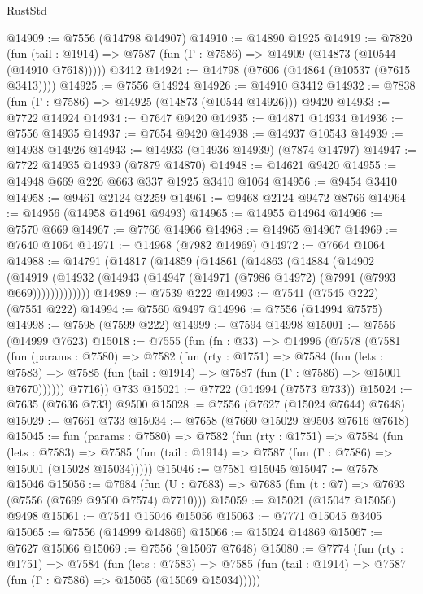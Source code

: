 \begin{lexlean}{RustStd}
\begin{coremodule}
@14909 := @7556 (@14798 @14907)
@14910 := @14890 @1925
@14919 := @7820
    (fun (tail : @1914) => @7587 (fun (Γ : @7586) => @14909 (@14873 (@10544 (@14910 @7618)))))
    @3412
@14924 := @14798 (@7606 (@14864 (@10537 (@7615 @3413))))
@14925 := @7556 @14924
@14926 := @14910 @3412
@14932 := @7838 (fun (Γ : @7586) => @14925 (@14873 (@10544 @14926))) @9420
@14933 := @7722 @14924
@14934 := @7647 @9420
@14935 := @14871 @14934
@14936 := @7556 @14935
@14937 := @7654 @9420
@14938 := @14937 @10543
@14939 := @14938 @14926
@14943 := @14933 (@14936 @14939) (@7874 @14797)
@14947 := @7722 @14935 @14939 (@7879 @14870)
@14948 := @14621 @9420
@14955 := @14948 @669 @226 @663 @337 @1925 @3410 @1064
@14956 := @9454 @3410
@14958 := @9461 @2124 @2259
@14961 := @9468 @2124 @9472 @8766
@14964 := @14956 (@14958 @14961 @9493)
@14965 := @14955 @14964
@14966 := @7570 @669
@14967 := @7766 @14966
@14968 := @14965 @14967
@14969 := @7640 @1064
@14971 := @14968 (@7982 @14969)
@14972 := @7664 @1064
@14988 := @14791
    (@14817
      (@14859
        (@14861
          (@14863
            (@14884
              (@14902
                (@14919
                  (@14932 (@14943 (@14947 (@14971 (@7986 @14972) (@7991 (@7993 @669)))))))))))))
@14989 := @7539 @222
@14993 := @7541 (@7545 @222) (@7551 @222)
@14994 := @7560 @9497
@14996 := @7556 (@14994 @7575)
@14998 := @7598 (@7599 @222)
@14999 := @7594 @14998
@15001 := @7556 (@14999 @7623)
@15018 := @7555
    (fun (fn : @33) =>
    @14996
      (@7578
        (@7581
          (fun (params : @7580) =>
          @7582
            (fun (rty : @1751) =>
            @7584
              (fun (lets : @7583) =>
              @7585 (fun (tail : @1914) => @7587 (fun (Γ : @7586) => @15001 @7670))))))
        @7716))
    @733
@15021 := @7722 (@14994 (@7573 @733))
@15024 := @7635 (@7636 @733) @9500
@15028 := @7556 (@7627 (@15024 @7644) @7648)
@15029 := @7661 @733
@15034 := @7658 (@7660 @15029 @9503 @7616 @7618)
@15045 := fun (params : @7580) =>
  @7582
    (fun (rty : @1751) =>
    @7584
      (fun (lets : @7583) =>
      @7585 (fun (tail : @1914) => @7587 (fun (Γ : @7586) => @15001 (@15028 @15034)))))
@15046 := @7581 @15045
@15047 := @7578 @15046
@15056 := @7684 (fun (U : @7683) => @7685 (fun (t : @7) => @7693 (@7556 (@7699 @9500 @7574) @7710)))
@15059 := @15021 (@15047 @15056) @9498
@15061 := @7541 @15046 @15056
@15063 := @7771 @15045 @3405
@15065 := @7556 (@14999 @14866)
@15066 := @15024 @14869
@15067 := @7627 @15066
@15069 := @7556 (@15067 @7648)
@15080 := @7774
    (fun (rty : @1751) =>
    @7584
      (fun (lets : @7583) =>
      @7585 (fun (tail : @1914) => @7587 (fun (Γ : @7586) => @15065 (@15069 @15034)))))

\end{coremodule}
\end{lexlean}
